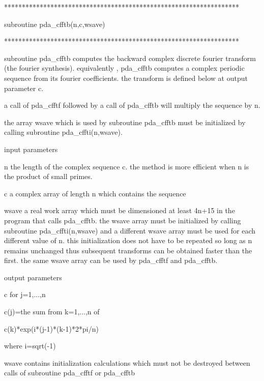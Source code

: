 \documentclass[11pt,twoside,nolof]{starlink}
\begin{document}
\begin{terminalv}
******************************************************************

subroutine pda_cfftb(n,c,wsave)

******************************************************************

subroutine pda_cfftb computes the backward complex discrete fourier
transform (the fourier synthesis). equivalently , pda_cfftb computes
a complex periodic sequence from its fourier coefficients.
the transform is defined below at output parameter c.

a call of pda_cfftf followed by a call of pda_cfftb will multiply the
sequence by n.

the array wsave which is used by subroutine pda_cfftb must be
initialized by calling subroutine pda_cffti(n,wsave).

input parameters


n      the length of the complex sequence c. the method is
       more efficient when n is the product of small primes.

c      a complex array of length n which contains the sequence

wsave   a real work array which must be dimensioned at least 4n+15
        in the program that calls pda_cfftb. the wsave array must be
        initialized by calling subroutine pda_cffti(n,wsave) and a
        different wsave array must be used for each different
        value of n. this initialization does not have to be
        repeated so long as n remains unchanged thus subsequent
        transforms can be obtained faster than the first.
        the same wsave array can be used by pda_cfftf and pda_cfftb.

output parameters

c      for j=1,...,n

           c(j)=the sum from k=1,...,n of

                 c(k)*exp(i*(j-1)*(k-1)*2*pi/n)

                       where i=sqrt(-1)

wsave   contains initialization calculations which must not be
        destroyed between calls of subroutine pda_cfftf or pda_cfftb
\end{terminalv}


\end{document}
